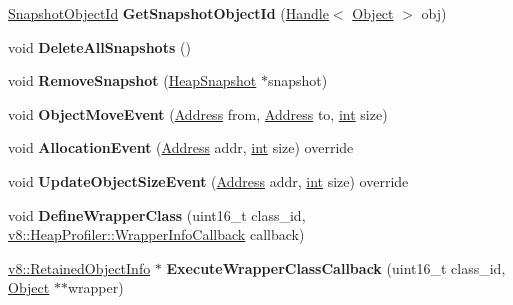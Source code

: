 \begin{DoxyCompactItemize}
\mbox{\hyperlink{classuint32__t}{Snapshot\+Object\+Id}} {\bfseries Get\+Snapshot\+Object\+Id} (\mbox{\hyperlink{classv8_1_1internal_1_1Handle}{Handle}}$<$ \mbox{\hyperlink{classv8_1_1internal_1_1Object}{Object}} $>$ obj)
\item 
\mbox{\label{classv8_1_1internal_1_1HeapProfiler_a95d369db8e294e4eb4d8e931d1eebf8e}} 
void {\bfseries Delete\+All\+Snapshots} ()
\item 
\mbox{\label{classv8_1_1internal_1_1HeapProfiler_abe0002601a7d13e03bf48713b7e2d3a0}} 
void {\bfseries Remove\+Snapshot} (\mbox{\hyperlink{classv8_1_1internal_1_1HeapSnapshot}{Heap\+Snapshot}} $\ast$snapshot)
\item 
\mbox{\label{classv8_1_1internal_1_1HeapProfiler_aef6308a35e96bc89e13295b9f08124f4}} 
void {\bfseries Object\+Move\+Event} (\mbox{\hyperlink{classuintptr__t}{Address}} from, \mbox{\hyperlink{classuintptr__t}{Address}} to, \mbox{\hyperlink{classint}{int}} size)
\item 
\mbox{\label{classv8_1_1internal_1_1HeapProfiler_a5d01f0ae788b5750b8666b5bcaac1227}} 
void {\bfseries Allocation\+Event} (\mbox{\hyperlink{classuintptr__t}{Address}} addr, \mbox{\hyperlink{classint}{int}} size) override
\item 
\mbox{\label{classv8_1_1internal_1_1HeapProfiler_a9cab209e97b9fe157554bdc45257140d}} 
void {\bfseries Update\+Object\+Size\+Event} (\mbox{\hyperlink{classuintptr__t}{Address}} addr, \mbox{\hyperlink{classint}{int}} size) override
\item 
\mbox{\label{classv8_1_1internal_1_1HeapProfiler_a4e741b3c78bcfc59084d52ec8d0148d1}} 
void {\bfseries Define\+Wrapper\+Class} (uint16\+\_\+t class\+\_\+id, \mbox{\hyperlink{classv8_1_1HeapProfiler_a677025dd201fd832e0464e5ab0b0d0d4}{v8\+::\+Heap\+Profiler\+::\+Wrapper\+Info\+Callback}} callback)
\item 
\mbox{\label{classv8_1_1internal_1_1HeapProfiler_a2c74f3148efb1f50112d7fc85174a1aa}} 
\mbox{\hyperlink{classv8_1_1RetainedObjectInfo}{v8\+::\+Retained\+Object\+Info}} $\ast$ {\bfseries Execute\+Wrapper\+Class\+Callback} (uint16\+\_\+t class\+\_\+id, \mbox{\hyperlink{classv8_1_1internal_1_1Object}{Object}} $\ast$$\ast$wrapper)
$$
\end{DoxyCompactItemize}
